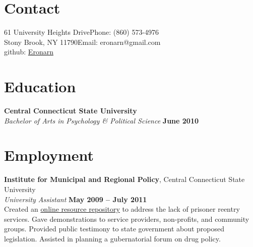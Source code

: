 \documentclass[margin,line]{resume}
\begin{document}
\begin{resume}

    \section{\mysidestyle Contact}

    61 University Heights Drive\hfill Phone: (860) 573-4976          \vspace{0mm}\\\vspace{0mm}%
    Stony Brook, NY 11790\hfill Email: eronarn@gmail.com  \vspace{0mm}\\\vspace{-4.5mm}%
    \hfill github: \href{https://github.com/Eronarn}{Eronarn}  \vspace{0mm}\\\vspace{-4.5mm}%
    \section{\mysidestyle Education}

    \textbf{Central Connecticut State University} \vspace{2mm}\\\vspace{1mm}%
    \textsl{Bachelor of Arts in Psychology \& Political Science} \hfill \textbf{June 2010}\vspace{-3mm}\\\vspace{-1mm}%

    \section{\mysidestyle Employment}

    \textbf{Institute for Municipal and Regional Policy}, Central Connecticut State University \vspace{2mm}\\\vspace{1mm}%
    \textsl{University Assistant} \hfill \textbf{May 2009 -- July 2011}\\
    Created an \href{http://www.ctreentry.info}{online resource repository} to address the lack of prisoner reentry services. Gave demonstrations to service providers, non-profits, and community groups. Provided public testimony to state government about proposed legislation. Assisted in planning a gubernatorial forum on drug policy.


\end{resume}
\end{document}
